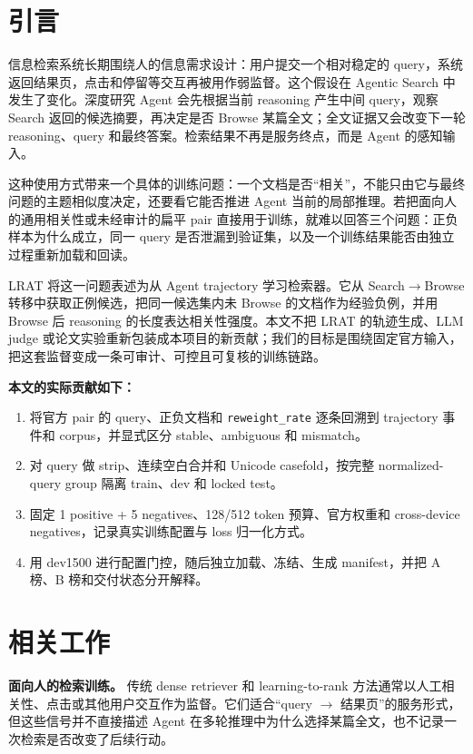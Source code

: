 \documentclass[UTF8,10pt,a4paper,twocolumn]{ctexart}
\begin{document}
\clearpage
\pagestyle{mainpage}
\twocolumn

\section{引言}

信息检索系统长期围绕人的信息需求设计：用户提交一个相对稳定的 query，系统返回结果页，点击和停留等交互再被用作弱监督。这个假设在 Agentic Search 中发生了变化。深度研究 Agent 会先根据当前 reasoning 产生中间 query，观察 Search 返回的候选摘要，再决定是否 Browse 某篇全文；全文证据又会改变下一轮 reasoning、query 和最终答案。检索结果不再是服务终点，而是 Agent 的感知输入。

这种使用方式带来一个具体的训练问题：一个文档是否“相关”，不能只由它与最终问题的主题相似度决定，还要看它能否推进 Agent 当前的局部推理。若把面向人的通用相关性或未经审计的扁平 pair 直接用于训练，就难以回答三个问题：正负样本为什么成立，同一 query 是否泄漏到验证集，以及一个训练结果能否由独立过程重新加载和回读。

LRAT 将这一问题表述为从 Agent trajectory 学习检索器\cite{lrat}。它从 Search$\rightarrow$Browse 转移中获取正例候选，把同一候选集内未 Browse 的文档作为经验负例，并用 Browse 后 reasoning 的长度表达相关性强度。本文不把 LRAT 的轨迹生成、LLM judge 或论文实验重新包装成本项目的新贡献；我们的目标是围绕固定官方输入，把这套监督变成一条可审计、可控且可复核的训练链路。

\textbf{本文的实际贡献如下：}
\begin{enumerate}
  \item 将官方 pair 的 query、正负文档和 \texttt{reweight\_rate} 逐条回溯到 trajectory 事件和 corpus，并显式区分 stable、ambiguous 和 mismatch。
  \item 对 query 做 strip、连续空白合并和 Unicode casefold，按完整 normalized-query group 隔离 train、dev 和 locked test。
  \item 固定 1 positive + 5 negatives、128/512 token 预算、官方权重和 cross-device negatives，记录真实训练配置与 loss 归一化方式。
  \item 用 dev1500 进行配置门控，随后独立加载、冻结、生成 manifest，并把 A 榜、B 榜和交付状态分开解释。
\end{enumerate}

\section{相关工作}

\textbf{面向人的检索训练。}
传统 dense retriever 和 learning-to-rank 方法通常以人工相关性、点击或其他用户交互作为监督。它们适合“query $\rightarrow$ 结果页”的服务形式，但这些信号并不直接描述 Agent 在多轮推理中为什么选择某篇全文，也不记录一次检索是否改变了后续行动。
\end{document}
